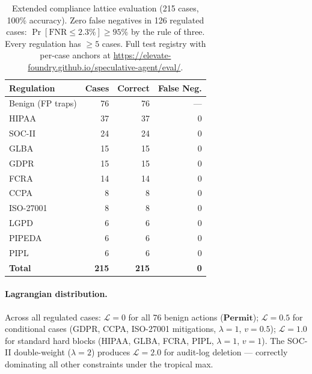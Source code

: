 \documentclass[11pt,twocolumn]{article}
\begin{document}
\begin{table}[h]
\centering
\caption{Extended compliance lattice evaluation (215 cases, 100\% accuracy).
  Zero false negatives in 126 regulated cases:
  $\Pr[\text{FNR} \leq 2.3\%] \geq 95\%$ by the rule of three.
  Every regulation has $\geq 5$ cases. Full test registry with per-case
  anchors at \url{https://elevate-foundry.github.io/speculative-agent/eval/}.}
\label{tab:eval-extended}
\begin{tabular}{lrrr}
\toprule
Regulation & Cases & Correct & False Neg. \\
\midrule
Benign (FP traps)  &    76 &    76 &      {---} \\
HIPAA              &    37 &    37 &          0 \\
SOC-II             &    24 &    24 &          0 \\
GLBA               &    15 &    15 &          0 \\
GDPR               &    15 &    15 &          0 \\
FCRA               &    14 &    14 &          0 \\
CCPA               &     8 &     8 &          0 \\
ISO-27001          &     8 &     8 &          0 \\
LGPD               &     6 &     6 &          0 \\
PIPEDA             &     6 &     6 &          0 \\
PIPL               &     6 &     6 &          0 \\
\midrule
\textbf{Total} & \textbf{215} & \textbf{215} & \textbf{0} \\
\bottomrule
\end{tabular}
\end{table}

\paragraph{Lagrangian distribution.}
Across all regulated cases: $\mathcal{L} = 0$ for all 76 benign actions
($\mathbf{Permit}$); $\mathcal{L} = 0.5$ for conditional cases
(GDPR, CCPA, ISO-27001 mitigations, $\lambda=1$, $v=0.5$);
$\mathcal{L} = 1.0$ for standard hard blocks (HIPAA, GLBA, FCRA, PIPL, $\lambda=1$,
$v=1$). The SOC-II double-weight ($\lambda = 2$)
produces $\mathcal{L} = 2.0$ for audit-log deletion ---
correctly dominating all other constraints under the tropical max.
\end{document}
